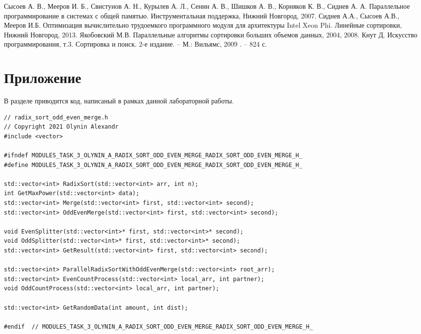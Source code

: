 \documentclass[12pt]{report}
\begin{document}
\begin{thebibliography}{1}
Сысоев А. В., Мееров И. Б., Свистунов А. Н., Курылев А. Л., Сенин А. В., Шишков А. В., Корняков К. В.,
Сиднев А. А. Параллельное программирование в системах с общей
памятью. Инструментальная поддержка, Нижний Новгород, 2007.
Сиднев А.А., Сысоев А.В., Мееров И.Б. Оптимизация вычислительно трудоемкого программного модуля для архитектуры Intel Xeon Phi. Линейные сортировки, Нижний Новгород, 2013.
Якобовский М.В. Параллельные алгоритмы сортировки больших объемов данных, 2004, 2008.
Кнут Д. Искусство программирования, т.3. Сортировка и поиск. 2-е издание. – М.: Вильямс, 2009 . – 824 с.
\end{thebibliography}
\newpage

\section*{Приложение}
В разделе приводится код, написаный в рамках данной лабораторной работы.


\begin{lstlisting}
// radix_sort_odd_even_merge.h
// Copyright 2021 Olynin Alexandr
#include <vector>

#ifndef MODULES_TASK_3_OLYNIN_A_RADIX_SORT_ODD_EVEN_MERGE_RADIX_SORT_ODD_EVEN_MERGE_H_
#define MODULES_TASK_3_OLYNIN_A_RADIX_SORT_ODD_EVEN_MERGE_RADIX_SORT_ODD_EVEN_MERGE_H_

std::vector<int> RadixSort(std::vector<int> arr, int n);
int GetMaxPower(std::vector<int> data);
std::vector<int> Merge(std::vector<int> first, std::vector<int> second);
std::vector<int> OddEvenMerge(std::vector<int> first, std::vector<int> second);

void EvenSplitter(std::vector<int>* first, std::vector<int>* second);
void OddSplitter(std::vector<int>* first, std::vector<int>* second);
std::vector<int> GetResult(std::vector<int> first, std::vector<int> second);

std::vector<int> ParallelRadixSortWithOddEvenMerge(std::vector<int> root_arr);
std::vector<int> EvenCountProcess(std::vector<int> local_arr, int partner);
void OddCountProcess(std::vector<int> local_arr, int partner);

std::vector<int> GetRandomData(int amount, int dist);

#endif  // MODULES_TASK_3_OLYNIN_A_RADIX_SORT_ODD_EVEN_MERGE_RADIX_SORT_ODD_EVEN_MERGE_H_
\end{lstlisting}
\end{document}
